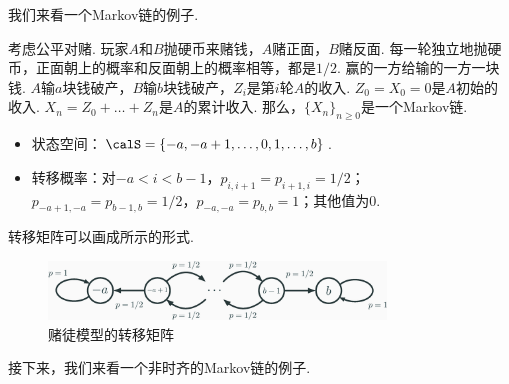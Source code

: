 我们来看一个Markov链的例子. 
\begin{example}[赌徒模型]
    考虑公平对赌. 玩家$A$和$B$抛硬币来赌钱，$A$赌正面，$B$赌反面. 每一轮独立地抛硬币，正面朝上的概率和反面朝上的概率相等，都是$1/2$. 赢的一方给输的一方一块钱. $A$输$a$块钱破产，$B$输$b$块钱破产，$Z_i$是第$i$轮$A$的收入. $Z_0=X_0=0$是$A$初始的收入. $X_n=Z_0+\dots+Z_n$是$A$的累计收入. 那么，$\{X_n\}_{n\geq 0}$是一个Markov链.
    \begin{itemize}
        \item 状态空间：$\calS=\{-a,-a+1,\dots,0,1,\dots,b\}$.
        \item 转移概率：对$-a<i<b-1$，$p_{i,i+1}=p_{i+1,i}=1/2$；$p_{-a+1,-a}=p_{b-1,b}=1/2$，$p_{-a,-a}=p_{b,b}=1$；其他值为$0$.
    \end{itemize}
    转移矩阵可以画成所示的形式.
    \begin{figure}[ht]
    \centering
    \includegraphics[width=0.8\textwidth]{Figures/Markov-chain/gampling.eps}
    \caption{赌徒模型的转移矩阵}\label{fig:gambling}
    \end{figure}
\end{example}

接下来，我们来看一个非时齐的Markov链的例子.

